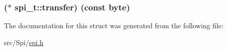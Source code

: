 \subsubsection[{transfer}]{($\ast$ spi\+\_\+t\+::transfer) (const {\bf byte})}\label{structspi__t_a55f7c22f62fbe49b04920f1902102f0c}


The documentation for this struct was generated from the following file\+:\begin{DoxyCompactItemize}
\item 
src/\+Spi/\hyperlink{spi_8h}{spi.\+h}\end{DoxyCompactItemize}
